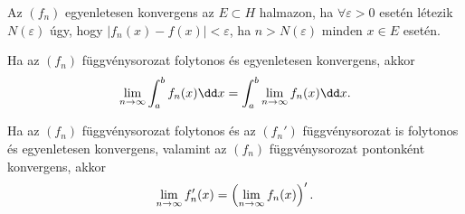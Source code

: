 \documentclass[a4paper, 12pt]{scrartcl}
\begin{document}
\begin{definition}
  Az  $(f_n)$ egyenletesen konvergens az $E \subset H$ halmazon, ha
  $\forall\varepsilon > 0$ esetén létezik $N(\varepsilon)$ úgy, hogy
  $|f_n(x) - f(x)| < \varepsilon$, ha $n > N(\varepsilon)$ minden $x \in E$
  esetén.
\end{definition}

\begin{blueBox}
  Ha az $(f_n)$ függvénysorozat folytonos és egyenletesen konvergens, akkor
  $$
    \lim_{n \to \infty} \int_a^b f_n(x) \dd x
    = \int_a^b \lim_{n \to \infty} f_n(x) \dd x
    \text.
  $$
\end{blueBox}

\begin{blueBox}
  Ha az $(f_n)$ függvénysorozat folytonos és az $(f_n')$ függvénysorozat
  is folytonos és egyenletesen konvergens, valamint az $(f_n)$ függvénysorozat
  pontonként konvergens, akkor
  $$
    \lim_{n \to \infty} f_n'(x)
    = \left( \lim_{n \to \infty} f_n(x) \right)'
    \text.
  $$
\end{blueBox}

\clearpage
\end{document}
